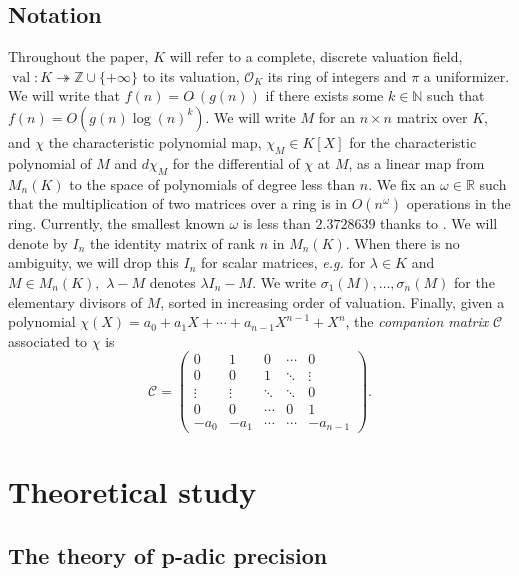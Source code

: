 \documentclass{sig-alternate-05-2015}
\DeclareMathOperator{\val}{val}
\newcommand{\Z}{\mathbb Z}
\newcommand{\R}{\mathbb R}
\newcommand{\OK}{\mathcal{O}_K}
\newcommand{\softO}{O\tilde{~}}
\begin{document}
\subsection*{Notation} Throughout the paper, $K$ will refer to a complete,
discrete valuation field, $\val : K \twoheadrightarrow \Z \cup \{+\infty\}$ to its valuation,
$\OK$ its ring of integers and $\pi$ a uniformizer. 
We will write that $f(n)=\softO (g(n))$ if there exists some
$k \in \mathbb{N}$ such that $f(n)=O(g(n) \log (n)^k).$
We will write $M$ for an $n \times n$ matrix over $K$,
and $\chi$ the characteristic polynomial map, $\chi_M \in K[X]$ for
the characteristic polynomial of $M$ and $d\chi_M$ for the differential
of $\chi$ at $M$, as a linear map from $M_n(K)$ to the space
of polynomials of degree less than $n$.
We fix an $\omega \in \R$ such that the multiplication
of two matrices over a ring is in $O(n^\omega)$ operations in the
ring. Currently, the smallest known $\omega$ is less than
$2.3728639 $ thanks to \cite{legall:14a}. 
We will denote by $I_n$ the identity matrix of rank $n$ in $M_n(K).$
When there is no ambiguity, we will drop this $I_n$
for scalar matrices, \textit{e.g.} for $\lambda \in K$
and $M \in M_n (K),$ $\lambda-M$ denotes $\lambda I_n - M.$
We write $\sigma_1(M), \dots, \sigma_n(M)$ for the
elementary divisors of $M$, sorted in increasing order of valuation.
Finally, given a polynomial $\chi(X) = a_0 + a_1 X + \cdots + a_{n-1} X^{n-1} + X^n$,
the \emph{companion matrix} $\mathscr{C}$ associated to $\chi$ is
\begin{equation}
\label{eq:companion}
\mathscr{C} = \left( \begin{matrix}
0 & 1 & 0 & \cdots & 0 \\
0 & 0 & 1 & \ddots & \vdots \\
\vdots & \vdots & \ddots & \ddots & 0 \\
0 & 0 & \cdots & 0 & 1 \\
-a_0 & -a_1 & \cdots & \cdots & -a_{n-1}
\end{matrix} \right).
\end{equation}

\section{Theoretical study}
\label{sec:theo_study}

\subsection{The theory of p-adic precision} \label{sec:padicprec}
\end{document}
